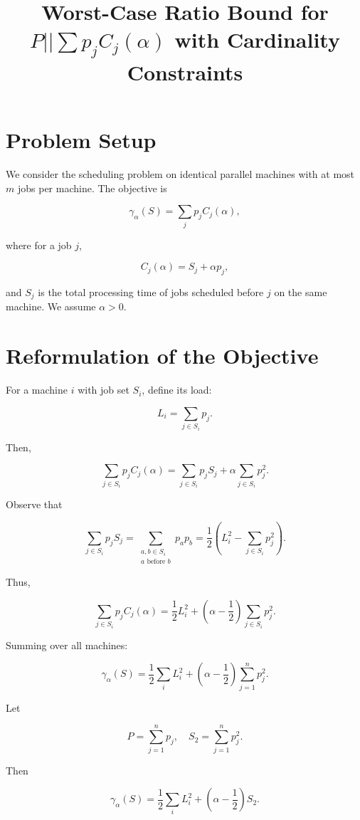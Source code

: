 \documentclass[11pt]{article}
\title{Worst-Case Ratio Bound for $P||\sum p_j C_j(\alpha)$ with Cardinality Constraints}
\author{}
\date{}
\begin{document}
\maketitle

\section*{Problem Setup}

We consider the scheduling problem on identical parallel machines with at most $m$ jobs per machine. The objective is

\[
\gamma_{\alpha}(S) = \sum_j p_j C_j(\alpha),
\]

where for a job $j$,

\[
C_j(\alpha) = S_j + \alpha p_j,
\]

and $S_j$ is the total processing time of jobs scheduled before $j$ on the same machine. We assume $\alpha > 0$.

\section*{Reformulation of the Objective}

For a machine $i$ with job set $S_i$, define its load:

\[
L_i = \sum_{j \in S_i} p_j.
\]

Then,

\[
\sum_{j \in S_i} p_j C_j(\alpha)
= \sum_{j \in S_i} p_j S_j + \alpha \sum_{j \in S_i} p_j^2.
\]

Observe that

\[
\sum_{j \in S_i} p_j S_j
= \sum_{\substack{a,b \in S_i \\ a \text{ before } b}} p_a p_b
= \frac{1}{2}\left(L_i^2 - \sum_{j \in S_i} p_j^2\right).
\]

Thus,

\[
\sum_{j \in S_i} p_j C_j(\alpha)
= \frac{1}{2} L_i^2 + \left(\alpha - \frac{1}{2}\right)\sum_{j \in S_i} p_j^2.
\]

Summing over all machines:

\[
\gamma_{\alpha}(S)
= \frac{1}{2} \sum_i L_i^2 + \left(\alpha - \frac{1}{2}\right)\sum_{j=1}^n p_j^2.
\]

Let

\[
P = \sum_{j=1}^n p_j, \quad S_2 = \sum_{j=1}^n p_j^2.
\]

Then

\[
\gamma_{\alpha}(S)
= \frac{1}{2} \sum_i L_i^2 + \left(\alpha - \frac{1}{2}\right) S_2.
\]
\end{document}
